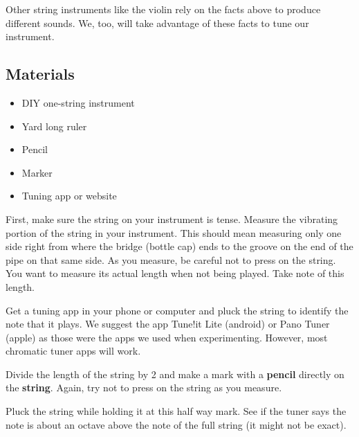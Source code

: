 \documentclass[12pt,noauthor,nooutcomes,hints,instructornotes]{ximera}%
\begin{document}
Other string instruments like the violin rely on the facts above to produce different sounds. We, too, will take advantage of these facts to tune our instrument.

\subsection{Materials}
\begin{itemize}
    \item DIY one-string instrument
    \item Yard long ruler
    \item Pencil
    \item Marker
    \item Tuning app or website
\end{itemize}

\begin{question} First, make sure the string on your instrument is tense. Measure the vibrating portion of the string in your instrument. This should mean measuring only one side right from where the bridge (bottle cap) ends to the groove on the end of the pipe on that same side. As you measure, be careful not to press on the string. You want to measure its actual length when not being played. Take note of this length.
\end{question}
\begin{question}
Get a tuning app in your phone or computer and pluck the string to identify the note that it plays. We suggest the app Tune!it Lite (android) or Pano Tuner (apple) as those were the apps we used when experimenting.  However, most chromatic tuner apps will work.
\end{question}

\begin{question}
Divide the length of the string by 2 and make a mark with a \textbf{pencil} directly on the \textbf{string}. Again, try not to press on the string as you measure.
\end{question}

\begin{question}
Pluck the string while holding it at this half way mark.  See if the tuner says the note is about an octave above the note of the full string (it might not be exact).
\end{question}
\end{document}
